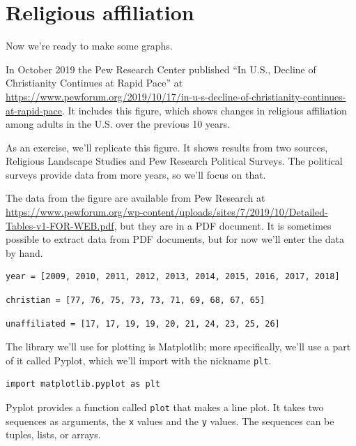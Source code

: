 \hypertarget{religious-affiliation}{%
\section{Religious affiliation}\label{religious-affiliation}}

Now we're ready to make some graphs.

In October 2019 the Pew Research Center published ``In U.S., Decline of
Christianity Continues at Rapid Pace'' at
\url{https://www.pewforum.org/2019/10/17/in-u-s-decline-of-christianity-continues-at-rapid-pace}.
It includes this figure, which shows changes in religious affiliation
among adults in the U.S. over the previous 10 years.

As an exercise, we'll replicate this figure. It shows results from two
sources, Religious Landscape Studies and Pew Research Political Surveys.
The political surveys provide data from more years, so we'll focus on
that.

The data from the figure are available from Pew Research at
\url{https://www.pewforum.org/wp-content/uploads/sites/7/2019/10/Detailed-Tables-v1-FOR-WEB.pdf},
but they are in a PDF document. It is sometimes possible to extract data
from PDF documents, but for now we'll enter the data by hand.

\begin{lstlisting}[]
year = [2009, 2010, 2011, 2012, 2013, 2014, 2015, 2016, 2017, 2018]
\end{lstlisting}

\begin{lstlisting}[]
christian = [77, 76, 75, 73, 73, 71, 69, 68, 67, 65]
\end{lstlisting}

\begin{lstlisting}[]
unaffiliated = [17, 17, 19, 19, 20, 21, 24, 23, 25, 26]
\end{lstlisting}

The library we'll use for plotting is Matplotlib; more specifically,
we'll use a part of it called Pyplot, which we'll import with the
nickname \passthrough{\lstinline!plt!}.

\begin{lstlisting}[]
import matplotlib.pyplot as plt
\end{lstlisting}

Pyplot provides a function called \passthrough{\lstinline!plot!} that
makes a line plot. It takes two sequences as arguments, the
\passthrough{\lstinline!x!} values and the \passthrough{\lstinline!y!}
values. The sequences can be tuples, lists, or arrays.

